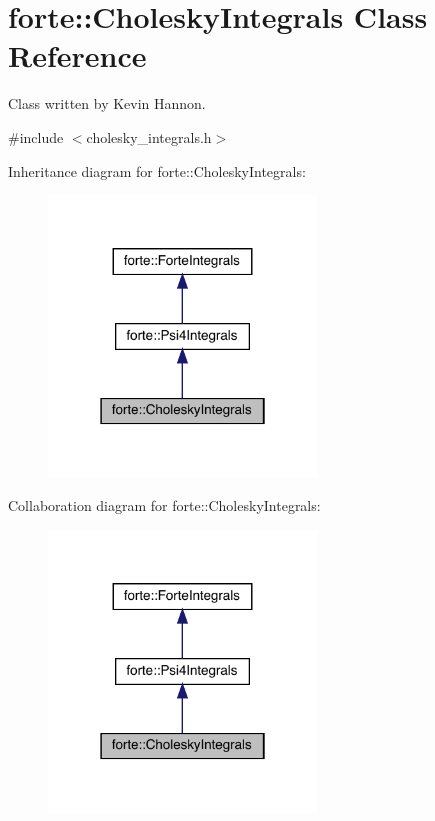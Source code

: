 \hypertarget{classforte_1_1_cholesky_integrals}{}\section{forte\+:\+:Cholesky\+Integrals Class Reference}
\label{classforte_1_1_cholesky_integrals}


Class written by Kevin Hannon.  




{\ttfamily \#include $<$cholesky\+\_\+integrals.\+h$>$}



Inheritance diagram for forte\+:\+:Cholesky\+Integrals\+:
\nopagebreak
\begin{figure}[H]
\begin{center}
\leavevmode
\includegraphics[width=202pt]{classforte_1_1_cholesky_integrals__inherit__graph}
\end{center}
\end{figure}


Collaboration diagram for forte\+:\+:Cholesky\+Integrals\+:
\nopagebreak
\begin{figure}[H]
\begin{center}
\leavevmode
\includegraphics[width=202pt]{classforte_1_1_cholesky_integrals__coll__graph}
\end{center}
\end{figure}
